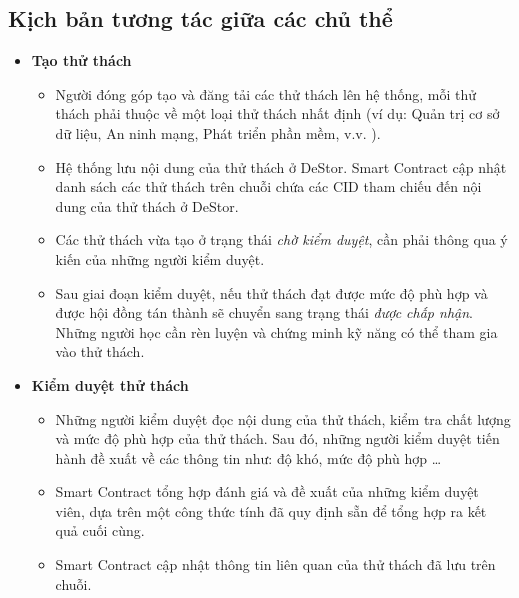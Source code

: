 \subsection{Kịch bản tương tác giữa các chủ thể}
\begin{itemize}
  \item \textbf{Tạo thử thách}
        \begin{itemize}
          \item Người đóng góp tạo và đăng tải các thử thách lên hệ thống, mỗi thử thách phải thuộc về một loại thử thách nhất định (ví dụ: Quản trị cơ sở dữ liệu, An ninh mạng, Phát triển phần mềm, v.v. ).
          \item Hệ thống lưu nội dung của thử thách ở DeStor. Smart Contract cập nhật danh sách các thử thách trên chuỗi chứa các CID tham chiếu đến nội dung của thử thách ở DeStor.
          \item Các thử thách vừa tạo ở trạng thái \textit{chờ kiểm duyệt}, cần phải thông qua ý kiến của những người kiểm duyệt.
          \item Sau giai đoạn kiểm duyệt, nếu thử thách đạt được mức độ phù hợp và được hội đồng tán thành sẽ chuyển sang trạng thái \textit{được chấp nhận}. Những người học cần rèn luyện và chứng minh kỹ năng có thể tham gia vào thử thách.
        \end{itemize}

  \item \textbf{Kiểm duyệt thử thách}
        \begin{itemize}
          \item Những người kiểm duyệt đọc nội dung của thử thách, kiểm tra chất lượng và mức độ phù hợp của thử thách. Sau đó, những người kiểm duyệt tiến hành đề xuất về các thông tin như: độ khó, mức độ phù hợp \dots
          \item Smart Contract tổng hợp đánh giá và đề xuất của những kiểm duyệt viên, dựa trên một công thức tính đã quy định sẵn để tổng hợp ra kết quả cuối cùng.
          \item Smart Contract cập nhật thông tin liên quan của thử thách đã lưu trên chuỗi.
        \end{itemize}


\end{itemize}
